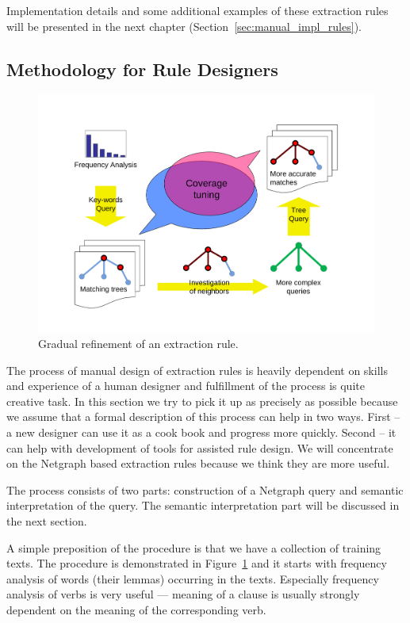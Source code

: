 Implementation details and some additional examples of these extraction rules will be presented in the next chapter (Section~\ref{sec:manual_impl_rules}).



\subsection{Methodology for Rule Designers} \label{sec:manual_rules_design}

\begin{figure}
	\centering
		\includegraphics[angle=-90, width=0.65\hsize]{coverge_tuning}
	\caption{Gradual refinement of an extraction rule.}
	\label{fig:manual_coverge_tuning}
\end{figure}


The process of manual design of extraction rules is heavily dependent on skills and experience of a human designer and fulfillment of the process is quite creative task. In this section we try to pick it up as precisely as possible because we assume that a formal description of this process can help in two ways. First -- a new designer can use it as a cook book and progress more quickly. Second -- it can help with development of tools for assisted rule design. We will concentrate on the Netgraph based extraction rules because we think they are more useful.

The process consists of two parts: construction of a Netgraph query and semantic interpretation of the query. The semantic interpretation part will be discussed in the next section.

A simple preposition of the procedure is that we have a collection of training texts.
The procedure is demonstrated in Figure~\ref{fig:manual_coverge_tuning} and it starts with frequency analysis of words (their lemmas) occurring in the texts. Especially frequency analysis of verbs is very useful --- meaning of a clause is usually strongly dependent on the meaning of the corresponding verb.

